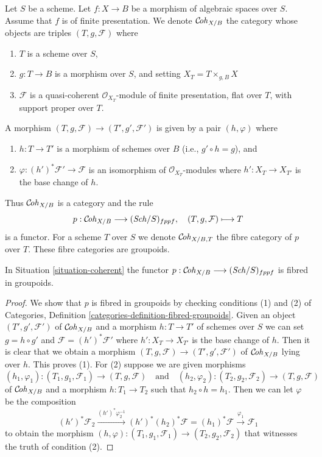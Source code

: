 \begin{situation}
\label{situation-coherent}
Let $S$ be a scheme. Let $f : X \to B$ be a morphism of algebraic spaces
over $S$. Assume that $f$ is of finite presentation.
We denote $\mathcal{C}\!\mathit{oh}_{X/B}$ the category whose objects are
triples $(T, g, \mathcal{F})$ where
\begin{enumerate}
\item $T$ is a scheme over $S$,
\item $g : T \to B$ is a morphism over $S$, and setting
$X_T = T \times_{g, B} X$
\item $\mathcal{F}$ is a quasi-coherent $\mathcal{O}_{X_T}$-module
of finite presentation, flat over $T$, with support proper over $T$.
\end{enumerate}
A morphism $(T, g, \mathcal{F}) \to (T', g', \mathcal{F}')$
is given by a pair $(h, \varphi)$ where
\begin{enumerate}
\item $h : T \to T'$ is a morphism of schemes over $B$
(i.e., $g' \circ h = g$), and
\item $\varphi : (h')^*\mathcal{F}' \to \mathcal{F}$ is an
isomorphism of $\mathcal{O}_{X_T}$-modules where $h' : X_T \to X_{T'}$
is the base change of $h$.
\end{enumerate}
\end{situation}

\noindent
Thus $\mathcal{C}\!\mathit{oh}_{X/B}$ is a category and the rule
$$
p : \mathcal{C}\!\mathit{oh}_{X/B} \longrightarrow (\mathit{Sch}/S)_{fppf},
\quad
(T, g, \mathcal{F}) \longmapsto T
$$
is a functor. For a scheme $T$ over $S$ we denote $\mathcal{C}\!\mathit{oh}_{X/B, T}$
the fibre category of $p$ over $T$. These fibre categories are groupoids.

\begin{lemma}
\label{lemma-coherent-fibred-in-groupoids}
In Situation \ref{situation-coherent} the functor
$p : \mathcal{C}\!\mathit{oh}_{X/B} \longrightarrow (\mathit{Sch}/S)_{fppf}$
is fibred in groupoids.
\end{lemma}

\begin{proof}
We show that $p$ is fibred in groupoids by checking conditions
(1) and (2) of Categories, Definition
\ref{categories-definition-fibred-groupoids}.
Given an object $(T', g', \mathcal{F}')$
of $\mathcal{C}\!\mathit{oh}_{X/B}$ and a morphism $h : T \to T'$ of
schemes over $S$ we can set $g = h \circ g'$ and
$\mathcal{F} = (h')^*\mathcal{F}'$ where $h' : X_T \to X_{T'}$
is the base change of $h$. Then it is clear that we obtain
a morphism $(T, g, \mathcal{F}) \to (T', g', \mathcal{F}')$
of $\mathcal{C}\!\mathit{oh}_{X/B}$ lying over $h$. This proves (1).
For (2) suppose we are given morphisms
$$
(h_1, \varphi_1) : (T_1, g_1, \mathcal{F}_1) \to (T, g, \mathcal{F})
\quad\text{and}\quad
(h_2, \varphi_2) : (T_2, g_2, \mathcal{F}_2) \to (T, g, \mathcal{F})
$$
of $\mathcal{C}\!\mathit{oh}_{X/B}$ and a morphism $h : T_1 \to T_2$ such that
$h_2 \circ h = h_1$. Then we can let $\varphi$ be the composition
$$
(h')^*\mathcal{F}_2
\xrightarrow{(h')^*\varphi_2^{-1}}
(h')^*(h_2)^*\mathcal{F} = (h_1)^*\mathcal{F}
\xrightarrow{\varphi_1}
\mathcal{F}_1
$$
to obtain the morphism
$(h, \varphi) : (T_1, g_1, \mathcal{F}_1) \to (T_2, g_2, \mathcal{F}_2)$
that witnesses the truth of condition (2).
\end{proof}

